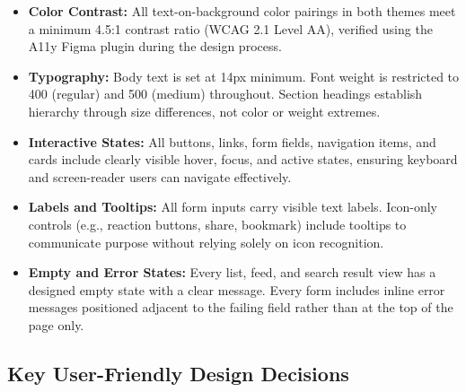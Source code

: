 \documentclass[12pt, a4paper]{article}
\begin{document}
\begin{itemize}
    \item \textbf{Color Contrast:} All text-on-background color pairings in both
    themes meet a minimum 4.5:1 contrast ratio (WCAG 2.1 Level AA), verified using
    the A11y Figma plugin during the design process.

    \item \textbf{Typography:} Body text is set at 14px minimum. Font weight is
    restricted to 400 (regular) and 500 (medium) throughout. Section headings
    establish hierarchy through size differences, not color or weight extremes.

    \item \textbf{Interactive States:} All buttons, links, form fields, navigation
    items, and cards include clearly visible hover, focus, and active states, ensuring
    keyboard and screen-reader users can navigate effectively.

    \item \textbf{Labels and Tooltips:} All form inputs carry visible text labels.
    Icon-only controls (e.g., reaction buttons, share, bookmark) include tooltips to
    communicate purpose without relying solely on icon recognition.

    \item \textbf{Empty and Error States:} Every list, feed, and search result view
    has a designed empty state with a clear message. Every form includes inline error
    messages positioned adjacent to the failing field rather than at the top of the
    page only.
\end{itemize}

\subsection{Key User-Friendly Design Decisions}
\end{document}
